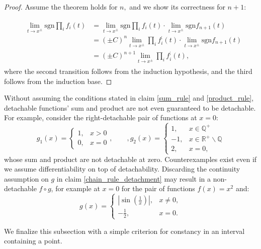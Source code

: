 \documentclass[11pt]{book}
\begin{document}
\begin{proof}
Assume the theorem holds for $n,$ and we show its correctness for $n+1$:

\begin{align}
&\begin{aligned}\underset{t\rightarrow x^{\pm}}{\lim}\text{sgn}\underset{i}{\prod}f_{i}\left(t\right) &=\underset{t\rightarrow x^{\pm}}{\lim}\text{sgn}\underset{i}{\prod}f_{i}\left(t\right)\cdot\underset{t\rightarrow x^{\pm}}{\lim}\text{sgn}f_{n+1}\left(t\right) \\
&=\left(\pm C\right)^{n}\underset{t\rightarrow x^{\pm}}{\lim}\underset{i}{\prod}f_{i}^{;}\left(t\right)\cdot\underset{t\rightarrow x^{\pm}}{\lim}\text{sgn}f_{n+1}\left(t\right)\\
&=\left(\pm C\right)^{n+1}\underset{t\rightarrow x^{\pm}}{\lim}\underset{i}{\prod}f_{i}^{;}\left(t\right),
\end{aligned}
\end{align}
where the second transition follows from the induction hypothesis, and the third follows from the induction base.
\end{proof}

\begin{remark}Without assuming the conditions stated in claim \ref{sum_rule} and \ref{product_rule}, detachable functions' sum and product are not even guaranteed to be detachable.
For example, consider the right-detachable pair of functions at $x=0$:
$$g_{1}\left(x\right)=\begin{cases}
1, & x>0\\
0, & x=0
\end{cases},\qquad,g_{2}\left(x\right)=\begin{cases}
1, & x\in\mathbb{Q^{+}}\\
-1, & x\in\mathbb{R^{+}\backslash\mathbb{Q}}\\
2, & x=0,
\end{cases}$$
whose sum and product are not detachable at zero. Counterexamples exist even if we assume differentiability on top of detachability.
Discarding the continuity assumption on $g$ in claim \ref{chain_rule_detachment} may result in a non-detachable $f \circ g$, for example at $x=0$ for the pair of functions $f\left(x\right)=x^{2}$ and: $$g\left(x\right)=\begin{cases}\left|\sin\left(\frac{1}{x}\right)\right|, & x\neq0,\\-\frac{1}{2}, & x=0.\end{cases}$$
\end{remark}

We finalize this subsection with a simple criterion for constancy in an interval containing a point.
\end{document}
